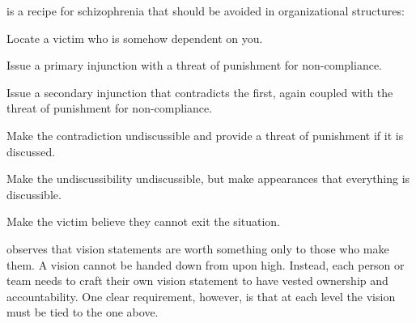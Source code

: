 \documentclass{tufte-handout}
\begin{document}
%
is a recipe for schizophrenia that should be avoided in organizational
structures:
\begin{compactenum}
 \item Locate a victim who is somehow dependent on you.
 \item Issue a primary injunction with a threat of punishment for
       non-compliance.
 \item Issue a secondary injunction that contradicts the first, again
       coupled with the threat of punishment for non-compliance.
 \item Make the contradiction undiscussible and provide a threat of
       punishment if it is discussed.
 \item Make%
       the undiscussibility undiscussible, but make appearances
       that everything is discussible.
 \item Make the victim believe they cannot exit the situation.
\end{compactenum}

 observes that vision statements are worth something
only to those who make them.%
A vision cannot be handed down from upon high.
Instead, each person or team needs to craft their own vision statement
to have vested ownership and accountability.
One clear requirement, however, is that at each level the vision must be
tied to the one above.
\end{document}
